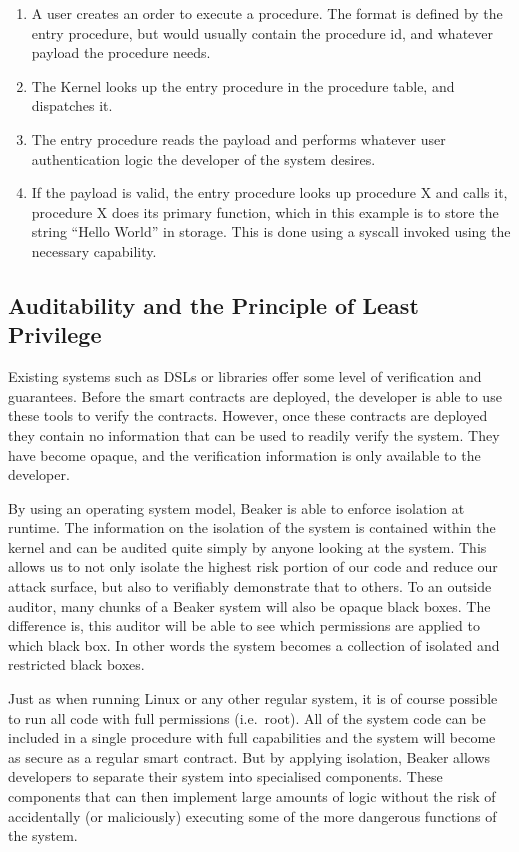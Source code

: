 \documentclass[english,a4paper]{article}
\begin{document}
\begin{enumerate}
\def\labelenumi{\arabic{enumi}.}
\item
  A user creates an order to execute a procedure. The format is defined
  by the entry procedure, but would usually contain the procedure id,
  and whatever payload the procedure needs.
\item
  The Kernel looks up the entry procedure in the procedure table, and
  dispatches it.
\item
  The entry procedure reads the payload and performs whatever user
  authentication logic the developer of the system desires.
\item
  If the payload is valid, the entry procedure looks up procedure X and
  calls it, procedure X does its primary function, which in this example
  is to store the string ``Hello World'' in storage. This is done using
  a syscall invoked using the necessary capability.
\end{enumerate}

\subsection{Auditability and the Principle of Least
Privilege}\label{auditability-and-the-principle-of-least-privilege}
Existing systems such as DSLs or libraries
offer some level of verification and guarantees. Before the smart
contracts are deployed, the developer is able to use these tools to
verify the contracts. However, once these contracts are deployed they
contain no information that can be used to readily verify the system.
They have become opaque, and the verification information is only
available to the developer.

By using an operating system model, Beaker is able to enforce isolation
at runtime. The information on the isolation of the system is contained
within the kernel and can be audited quite simply by anyone looking at
the system. This allows us to not only isolate the highest risk portion
of our code and reduce our attack surface, but also to verifiably
demonstrate that to others. To an outside auditor, many chunks of a
Beaker system will also be opaque black boxes. The difference is, this
auditor will be able to see which permissions are applied to which black
box. In other words the system becomes a collection of isolated and
restricted black boxes.

Just as when running Linux or any other regular system, it is of course
possible to run all code with full permissions (i.e.~root). All of the
system code can be included in a single procedure with full capabilities
and the system will become as secure as a regular smart contract. But by
applying isolation, Beaker allows developers to separate their system
into specialised components. These components that can then implement
large amounts of logic without the risk of accidentally (or maliciously)
executing some of the more dangerous functions of the system.
\end{document}
